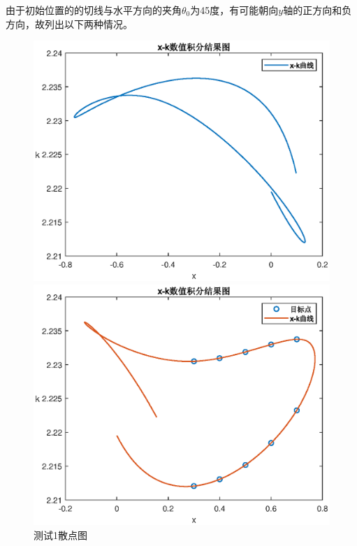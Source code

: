 \documentclass[withoutpreface,bwprint]{cumcmthesis}
\begin{document}
由于初始位置的的切线与水平方向的夹角$\theta_0$为45度，有可能朝向$y$轴的正方向和负方向，故列出以下两种情况。
\vspace{2cm}
\begin{figure}[!h]  
\centering  
\begin{minipage}{.5\textwidth}  
  \centering  
  \includegraphics[width=.9\linewidth]{Q1x-k+45.eps}  
\end{minipage}%
\begin{minipage}{.5\textwidth}  
  \centering  
  \includegraphics[width=.9\linewidth]{Q1x-k.eps}  
\end{minipage}  
\caption{测试1散点图}  
\end{figure}  
\end{document}

